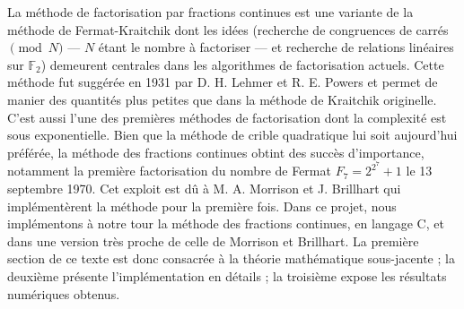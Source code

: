 
La méthode de factorisation par fractions continues est une variante de la
méthode de Fermat-Kraitchik dont les idées (recherche de congruences de carrés
$\pmod{N}$ — $N$ étant le nombre à factoriser — et recherche de relations
linéaires sur $\mathbb{F}_2$) demeurent centrales dans les algorithmes de
factorisation actuels. Cette méthode fut suggérée en 1931 par D. H. Lehmer et
R. E. Powers et permet de manier des quantités plus petites que dans la méthode
de Kraitchik originelle. C'est aussi l'une des premières méthodes de
factorisation dont la complexité est sous exponentielle. Bien que la méthode
de crible quadratique lui soit aujourd'hui préférée, la méthode des fractions
continues obtint des succès d'importance, notamment la première factorisation
du nombre de Fermat $F_7 = 2^{2^7} + 1$ le 13 septembre 1970. Cet exploit est
dû à M. A. Morrison et J. Brillhart qui implémentèrent la méthode pour la
première fois. Dans ce projet, nous implémentons à notre tour la méthode des
fractions continues, en langage C, et dans une version très proche de celle de
Morrison et Brillhart. La première section de ce texte est donc consacrée à la
théorie mathématique sous-jacente ; la deuxième présente l'implémentation en
détails ; la troisième expose les résultats numériques obtenus.
